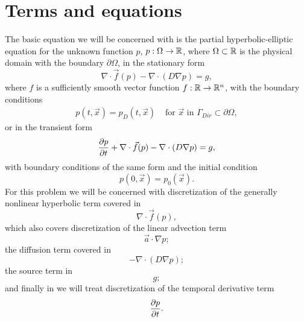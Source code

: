\providecommand{\elint}{\int_{T^k}}
\providecommand{\elbint}{\int_{\partial T^k}}
\section{Terms and equations}
The basic equation we will be concerned with is the partial hyperbolic-elliptic
equation for the unknown function $p$, $p : \Omega \rightarrow \mathbb{R}$, where
$\Omega \subset \mathbb{R}$ is the physical domain with the boundary $\partial\Omega$, in
the stationary form
\begin{equation}
\label{eq:hyp_diff}
\nabla\cdot \vec{f}(p) -  \nabla \cdot (D \nabla p) = g,
\end{equation}
where $f$ is a sufficiently smooth vector function $f: \mathbb{R}
\rightarrow\mathbb{R}^n$, with the boundary conditions
\begin{align}\label{eq:diff_bcs}
p(t, \vec{x}) = p_D(t, \vec{x}) & \text{ for } \vec{x} \text{ in }
\Gamma_{Dir} \subset \partial\Omega,
\end{align}
or in the transient form
\begin{equation}
\label{eq:hyp_diff_trans}
\frac{\partial p}{\partial t} + \nabla\cdot \vec{f}(p) -  \nabla \cdot (D \nabla p) = g,
\end{equation}
with boundary conditions of the same form and the initial condition
\begin{equation}
\label{eq:diff_ic}
p(0, \vec{x}) = p_0(\vec{x}).
\end{equation}
For this problem we will be concerned with discretization of the generally
nonlinear hyperbolic term covered in 
\begin{equation}
\nabla\cdot \vec{f}(p),
\end{equation}
which also covers discretization of the linear advection term
\begin{equation}
\vec{a} \cdot \nabla p;
\end{equation}
the diffusion term covered in 
\begin{equation}
-  \nabla \cdot (D \nabla p);
\end{equation}
the source term in 
\begin{equation}
g;
\end{equation}
and finally in  we will
treat discretization of the temporal derivative term
\begin{equation}
\frac{\partial p}{\partial t}.
\end{equation}



